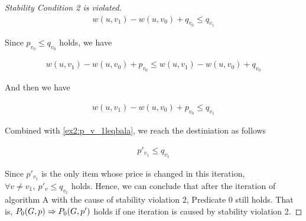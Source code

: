 \documentclass[11pt,a4paper]{article}
\begin{document}
\begin{proof}[Stability Condition 2 is violated]
    \begin{align}
        w(u, v_1) - w(u, v_0) + q_{v_0} \leq q_{v_1}
    \end{align}

    Since $p_{v_0} \leq q_{v_0}$ holds, we have 
    
    \begin{align}
     w(u, v_1) - w(u, v_0) + p_{v_0} \leq w(u, v_1) - w(u, v_0) + q_{v_0}
    \end{align}

    And then we have

    \begin{align}
        w(u, v_1) - w(u, v_0) + p_{v_0} \leq q_{v_1}
    \end{align}

    Combined with \eqref{ex2:p_v_1leqbala}, we reach the destiniation as
    follows

    \begin{align}
        p'_{v_1} \leq q_{v_1}
    \end{align}

    Since $p'_{v_1}$ is the only item whose price is changed in this
    iteration, $\forall v \neq v_1,\ p'_{v} \leq q_{v_1}$ holds. Hence, we can
    conclude that after the iteration of algorithm A with the cause of
    stability violation 2, Predicate 0 still holds.
    That is, $ P_0(G, p) \Rightarrow P_0(G, p') $ holds if one iteration is
    caused by stability violation 2.

\end{proof}
\end{document}
